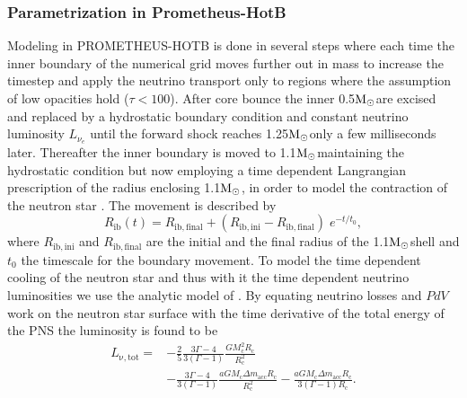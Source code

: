 \documentclass[fleqn,usenatbib]{mnras}
\newcommand{\solm}{\xspace\ensuremath{\rm{M_{\odot}}}}
\newcommand{\prom}{\textsc{P{\footnotesize ROMETHEUS}-H{\footnotesize OT}B}\xspace}
\begin{document}
\subsubsection{Parametrization in Prometheus-HotB}
Modeling in \prom is done in several steps where each time the inner boundary of the numerical grid moves further out in mass to increase the timestep and apply the neutrino transport only to regions where the assumption of low opacities hold ($\tau < 100$).
After core bounce the inner 0.5\solm are excised and replaced by a hydrostatic boundary condition and constant neutrino luminosity $L_{\nu_{e}}$ until the forward shock reaches 1.25\solm only a few milliseconds later. Thereafter the inner boundary is moved to 1.1\solm maintaining the hydrostatic condition but now employing a time dependent Langrangian prescription of the radius enclosing 1.1\solm,  in order to model the contraction of the neutron star .
The movement is described by
\begin{equation}
	R_{\mathrm{ib}}(t) = R_{\mathrm{ib,final}} + (R_{\mathrm{ib,ini}} - R_{\mathrm{ib,final}})\; e^{-t/t_0},
\end{equation}
where $R_{\mathrm{ib,ini}}$ and $R_{\mathrm{ib,final}}$ are the initial and the final radius of the 1.1\solm shell and $t_0$ the timescale for the boundary movement. 
To model the time dependent cooling of the neutron star and thus with it the time dependent neutrino luminosities we use the analytic model of \cite{Ugliano2012}. By equating neutrino losses and $PdV$ work on the neutron star surface with the time derivative of the total energy of the PNS the luminosity is found to be
\begin{equation}
\begin{split}
\label{eqn:lib}
	L_{\mathrm{\nu,tot}} = & - \frac{2}{5} \frac{3\Gamma - 4}{3(\Gamma - 1)} \frac{GM^2_{\mathrm{c}} R_{\mathrm{c}}}{R_{\mathrm{c}}^2} \\
            &  - \frac{3\Gamma - 4} {3(\Gamma - 1)} \frac{aGM_{\mathrm{c}}\Delta m_{\mathrm{acc}}R_\mathrm{c}}{R^2_{\mathrm{c}}}  -\frac{aGM_{\mathrm{c}}\Delta m_{\mathrm{acc}}R_{\mathrm{c}}}{3(\Gamma - 1)R_{\mathrm{c}}}.
\end{split}
\end{equation}
\end{document}
